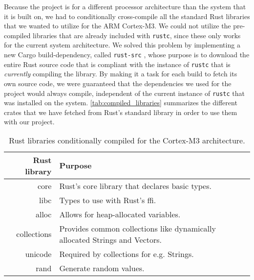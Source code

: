 Because the project is for a different processor architecture than the system that it is built on, we had to conditionally cross-compile all the standard Rust libraries that we wanted to utilize for the ARM Cortex-M3.
We could not utilize the pre-compiled libraries that are already included with \texttt{rustc}, since these only works for the current system architecture.
We solved this problem by implementing a new Cargo build-dependency, called \texttt{rust-src} \cite{github:rust_src}, whose purpose is to download the entire Rust source code that is compliant with the instance of \texttt{rustc} that is \emph{currently} compiling the library.
By making it a task for each build to fetch its own source code, we were guaranteed that the dependencies we used for the project would always compile, independent of the current instance of \texttt{rustc} that was installed on the system.
\autoref{tab:compiled_libraries} summarizes the different crates that we have fetched from Rust's standard library in order to use them with our project.


\begin{table}[ht]
\begin{center}
\begin{tabular}{r|p{8cm}}
\textbf{Rust library} & \textbf{Purpose} \\
\hline
core        & Rust's core library that declares basic types. \\
libc        & Types to use with Rust's \gls{ffi}. \\
alloc       & Allows for heap-allocated variables. \\
collections & Provides common collections like dynamically allocated Strings and Vectors. \\
unicode     & Required by collections for e.g. Strings. \\
rand        & Generate random values. \\
\hline
\end{tabular}
\caption{Rust libraries conditionally compiled for the Cortex-M3 architecture.}
\label{tab:compiled_libraries}
\end{center}
\end{table}

